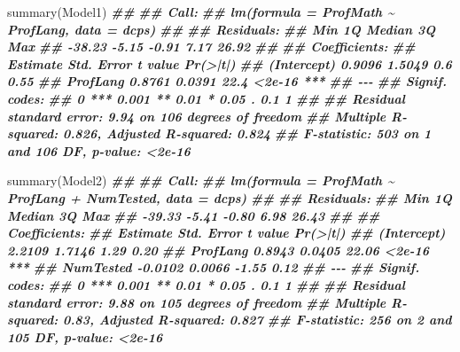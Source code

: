 \documentclass[
  12pt,
]{krantz}
\newenvironment{Shaded}{\begin{snugshade}}{\end{snugshade}}
\newcommand{\DocumentationTok}[1]{\textcolor[rgb]{0.56,0.35,0.01}{\textbf{\textit{#1}}}}
\newcommand{\FunctionTok}[1]{\textcolor[rgb]{0.00,0.00,0.00}{#1}}
\newcommand{\NormalTok}[1]{#1}
\begin{document}
\begin{Shaded}
\begin{Highlighting}[]
  \FunctionTok{summary}\NormalTok{(Model1)}
\DocumentationTok{\#\# }
\DocumentationTok{\#\# Call:}
\DocumentationTok{\#\# lm(formula = ProfMath \textasciitilde{} ProfLang, data = dcps)}
\DocumentationTok{\#\# }
\DocumentationTok{\#\# Residuals:}
\DocumentationTok{\#\#    Min     1Q Median     3Q    Max }
\DocumentationTok{\#\# {-}38.23  {-}5.15  {-}0.91   7.17  26.92 }
\DocumentationTok{\#\# }
\DocumentationTok{\#\# Coefficients:}
\DocumentationTok{\#\#             Estimate Std. Error t value Pr(\textgreater{}|t|)    }
\DocumentationTok{\#\# (Intercept)   0.9096     1.5049     0.6     0.55    }
\DocumentationTok{\#\# ProfLang      0.8761     0.0391    22.4   \textless{}2e{-}16 ***}
\DocumentationTok{\#\# {-}{-}{-}}
\DocumentationTok{\#\# Signif. codes:  }
\DocumentationTok{\#\# 0 \textquotesingle{}***\textquotesingle{} 0.001 \textquotesingle{}**\textquotesingle{} 0.01 \textquotesingle{}*\textquotesingle{} 0.05 \textquotesingle{}.\textquotesingle{} 0.1 \textquotesingle{} \textquotesingle{} 1}
\DocumentationTok{\#\# }
\DocumentationTok{\#\# Residual standard error: 9.94 on 106 degrees of freedom}
\DocumentationTok{\#\# Multiple R{-}squared:  0.826,  Adjusted R{-}squared:  0.824 }
\DocumentationTok{\#\# F{-}statistic:  503 on 1 and 106 DF,  p{-}value: \textless{}2e{-}16}

  \FunctionTok{summary}\NormalTok{(Model2)}
\DocumentationTok{\#\# }
\DocumentationTok{\#\# Call:}
\DocumentationTok{\#\# lm(formula = ProfMath \textasciitilde{} ProfLang + NumTested, data = dcps)}
\DocumentationTok{\#\# }
\DocumentationTok{\#\# Residuals:}
\DocumentationTok{\#\#    Min     1Q Median     3Q    Max }
\DocumentationTok{\#\# {-}39.33  {-}5.41  {-}0.80   6.98  26.43 }
\DocumentationTok{\#\# }
\DocumentationTok{\#\# Coefficients:}
\DocumentationTok{\#\#             Estimate Std. Error t value Pr(\textgreater{}|t|)    }
\DocumentationTok{\#\# (Intercept)   2.2109     1.7146    1.29     0.20    }
\DocumentationTok{\#\# ProfLang      0.8943     0.0405   22.06   \textless{}2e{-}16 ***}
\DocumentationTok{\#\# NumTested    {-}0.0102     0.0066   {-}1.55     0.12    }
\DocumentationTok{\#\# {-}{-}{-}}
\DocumentationTok{\#\# Signif. codes:  }
\DocumentationTok{\#\# 0 \textquotesingle{}***\textquotesingle{} 0.001 \textquotesingle{}**\textquotesingle{} 0.01 \textquotesingle{}*\textquotesingle{} 0.05 \textquotesingle{}.\textquotesingle{} 0.1 \textquotesingle{} \textquotesingle{} 1}
\DocumentationTok{\#\# }
\DocumentationTok{\#\# Residual standard error: 9.88 on 105 degrees of freedom}
\DocumentationTok{\#\# Multiple R{-}squared:  0.83,   Adjusted R{-}squared:  0.827 }
\DocumentationTok{\#\# F{-}statistic:  256 on 2 and 105 DF,  p{-}value: \textless{}2e{-}16}
\end{Highlighting}
\end{Shaded}
\end{document}

